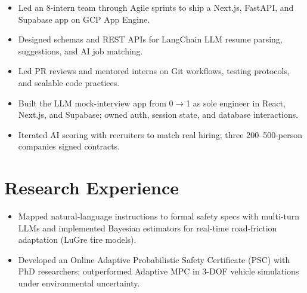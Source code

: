 \documentclass[11pt, letterpaper]{article}
\begin{document}
\vspace{1pt}
\begin{itemize}
  \item Led an 8-intern team through Agile sprints to ship a Next.js, FastAPI, and Supabase app on GCP App Engine.
  \item Designed schemas and REST APIs for LangChain LLM resume parsing, suggestions, and AI job matching.
  \item Led PR reviews and mentored interns on Git workflows, testing protocols, and scalable code practices.
\end{itemize}

\vspace{1pt}
\begin{itemize}
  \item Built the LLM mock-interview app from 0$\to$1 as sole engineer in React, Next.js, and Supabase; owned auth, session state, and database interactions.
  \item Iterated AI scoring with recruiters to match real hiring; three 200--500-person companies signed contracts.
\end{itemize}

\section{Research Experience}
\begin{itemize}
  \item Mapped natural-language instructions to formal safety specs with multi-turn LLMs and implemented Bayesian estimators for real-time road-friction adaptation (LuGre tire models).
  \item Developed an Online Adaptive Probabilistic Safety Certificate (PSC) with PhD researchers; outperformed Adaptive MPC in 3-DOF vehicle simulations under environmental uncertainty.
\end{itemize}
\end{document}
